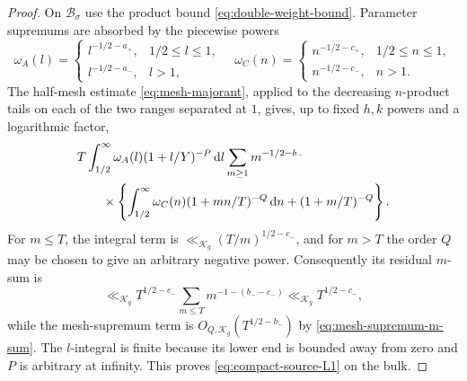 \begin{proof}
On $\mathcal B_\sigma$ use the product bound
\eqref{eq:double-weight-bound}.  Parameter supremums are absorbed by the
piecewise powers
\[
 \omega_A(l)=
 \begin{cases}l^{-1/2-a_+},&1/2\leq l\leq1,\\
 l^{-1/2-a_-},&l>1,
 \end{cases}
 \quad
 \omega_C(n)=
 \begin{cases}n^{-1/2-c_+},&1/2\leq n\leq1,\\
 n^{-1/2-c_-},&n>1.
 \end{cases}
\]
The half-mesh estimate \eqref{eq:mesh-majorant}, applied to the decreasing
$n$-product tails on each of the two ranges separated at $1$, gives, up to fixed
$h,k$ powers and a logarithmic factor,
\begin{align}
 &T\int_{1/2}^\infty\omega_A(l)(1+l/Y)^{-P}\,\mathrm d l
 \sum_{m\geq1}m^{-1/2-b_-}\notag\\
 &\qquad\times\left\{
 \int_{1/2}^\infty\omega_C(n)(1+mn/T)^{-Q}\,\mathrm d n
 +(1+m/T)^{-Q}\right\}.
 \label{eq:compact-bulk-majorant}
\end{align}
For $m\leq T$, the integral term is
$\ll_{\mathscr K_g} (T/m)^{1/2-c_-}$, and for $m>T$ the order $Q$ may be
chosen to give an arbitrary negative power.  Consequently its residual $m$-sum is
\[
 \ll_{\mathscr K_g}T^{1/2-c_-}
 \sum_{m\leq T}m^{-1-(b_--c_-)}
 \ll_{\mathscr K_g}T^{1/2-c_-},
\]
while the mesh-supremum term is
$O_{Q,\mathscr K_g}(T^{1/2-b_-})$ by
\eqref{eq:mesh-supremum-m-sum}.  The $l$-integral is finite because
its lower end is bounded away from zero and $P$ is arbitrary at infinity.  This proves
\eqref{eq:compact-source-L1} on the bulk.


\end{proof}
